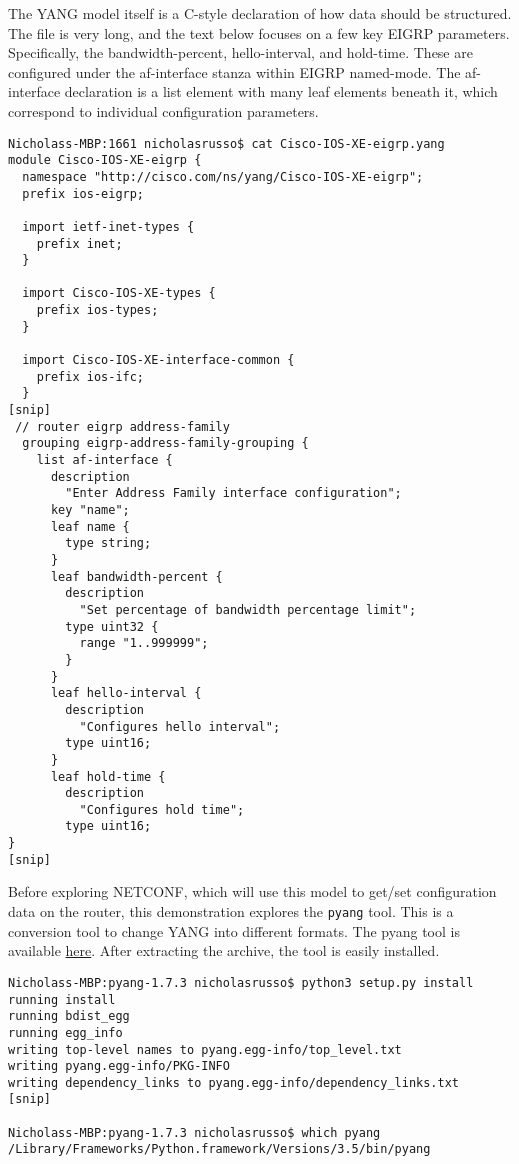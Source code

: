 The YANG model itself is a C-style declaration of how data should be
structured. The file is very long, and the text below focuses on a few key
EIGRP parameters. Specifically, the bandwidth-percent, hello-interval, and
hold-time. These are configured under the af-interface stanza within EIGRP
named-mode. The af-interface declaration is a list element with many leaf
elements beneath it, which correspond to individual configuration parameters.

\begin{verbatim}
Nicholass-MBP:1661 nicholasrusso$ cat Cisco-IOS-XE-eigrp.yang
module Cisco-IOS-XE-eigrp {
  namespace "http://cisco.com/ns/yang/Cisco-IOS-XE-eigrp";
  prefix ios-eigrp;

  import ietf-inet-types {
    prefix inet;
  }

  import Cisco-IOS-XE-types {
    prefix ios-types;
  }

  import Cisco-IOS-XE-interface-common {
    prefix ios-ifc;
  }
[snip]
 // router eigrp address-family
  grouping eigrp-address-family-grouping {
    list af-interface {
      description
        "Enter Address Family interface configuration";
      key "name";
      leaf name {
        type string;
      }
      leaf bandwidth-percent {
        description
          "Set percentage of bandwidth percentage limit";
        type uint32 {
          range "1..999999";
        }
      }
      leaf hello-interval {
        description
          "Configures hello interval";
        type uint16;
      }
      leaf hold-time {
        description
          "Configures hold time";
        type uint16;
}
[snip]
\end{verbatim}

Before exploring NETCONF, which will use this model to get/set configuration
data on the router, this demonstration explores the \verb|pyang| tool. This is a
conversion tool to change YANG into different formats. The pyang tool is
available \href{https://pypi.python.org/pypi/pyang}{here}. After extracting the
archive, the tool is easily installed.

\begin{verbatim}
Nicholass-MBP:pyang-1.7.3 nicholasrusso$ python3 setup.py install
running install
running bdist_egg
running egg_info
writing top-level names to pyang.egg-info/top_level.txt
writing pyang.egg-info/PKG-INFO
writing dependency_links to pyang.egg-info/dependency_links.txt
[snip]

Nicholass-MBP:pyang-1.7.3 nicholasrusso$ which pyang
/Library/Frameworks/Python.framework/Versions/3.5/bin/pyang
\end{verbatim}

